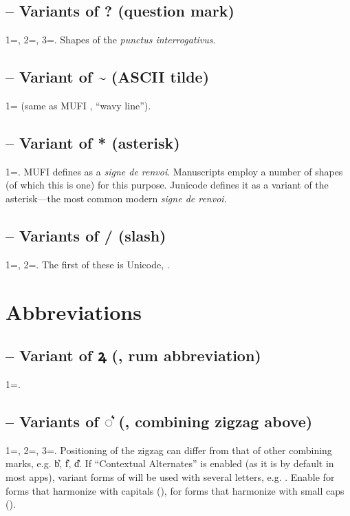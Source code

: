 \subsection{
-- Variants of ? (question mark)}
1=, 2=, 3=. Shapes of the \textit{punctus interrogativus}.

\subsection{
-- Variant of \~{} (ASCII tilde)}
1= (same as MUFI , ``wavy line'').

\subsection{ --
Variant of * (asterisk)}
1=. MUFI defines  as a \textit{signe de renvoi}. Manuscripts employ a number of shapes (of which this is one) for
this purpose. Junicode defines it as a variant of the asterisk---the most common modern \textit{signe de renvoi}.

\subsection{ -- Variants of / (slash)}
1=, 2=. The first of these is Unicode, .

\section{Abbreviations}
\subsection{ -- Variant of ꝝ (, rum
abbreviation)}
1=.

\subsection{ -- Variants of ◌͛ (, combining
zigzag above)}
1=, 2=, 3=. Positioning of the zigzag can differ from that of other combining
marks, e.g. b͛, f͛, d͛. If  ``Contextual Alternates'' is enabled (as it is by
default in most apps), variant forms of  will be used with several letters, e.g. . Enable  for forms that harmonize with capitals
({}),  for forms that harmonize with small caps
  (\textsc{}).

